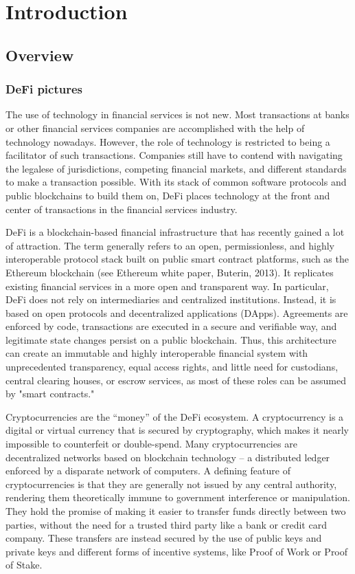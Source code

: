 \chapter{Introduction} \label{Introduction}
\minitoc

\section{Overview}

\subsection{DeFi pictures}

The use of technology in financial services is not new. Most transactions at banks or other financial services companies are accomplished with the help of technology nowadays. However, the role of technology is restricted to being a facilitator of such transactions. Companies still have to contend with navigating the legalese of jurisdictions, competing financial markets, and different standards to make a transaction possible. With its stack of common software protocols and public blockchains to build them on, DeFi places technology at the front and center of transactions in the financial services industry.

DeFi is a blockchain-based financial infrastructure that has recently gained a lot of attraction. The term generally refers to an open, permissionless, and highly interoperable protocol stack built on public smart contract platforms, such as the Ethereum blockchain (see Ethereum white paper, Buterin, 2013). It replicates existing financial services in a more open and transparent way. In particular, DeFi does not rely on intermediaries and centralized institutions. Instead, it is based on open protocols and decentralized applications (DApps). Agreements are enforced by code, transactions are executed in a secure and verifiable way, and legitimate state changes persist on a public blockchain. Thus, this architecture can create an immutable and highly interoperable financial system with unprecedented transparency, equal access rights, and little need for custodians, central clearing houses, or escrow services, as most of these roles can be assumed by "smart contracts."

Cryptocurrencies are the “money” of the DeFi ecosystem. A cryptocurrency is a digital or virtual currency that is secured by cryptography, which makes it nearly impossible to counterfeit or double-spend. Many cryptocurrencies are decentralized networks based on blockchain technology – a distributed ledger enforced by a disparate network of computers. A defining feature of cryptocurrencies is that they are generally not issued by any central authority, rendering them theoretically immune to government interference or manipulation. They hold the promise of making it easier to transfer funds directly between two parties, without the need for a trusted third party like a bank or credit card company. These transfers are instead secured by the use of public keys and private keys and different forms of incentive systems, like Proof of Work or Proof of Stake.

